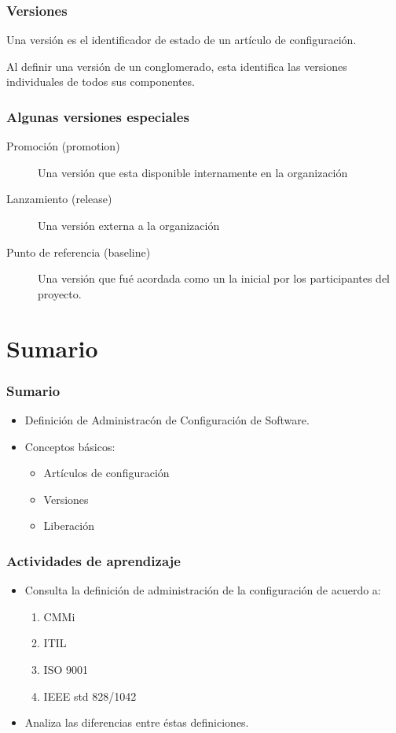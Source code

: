 \begin{frame}
\frametitle{Versiones}

\begin{definicion}
Una \alert{versi\'on} es el identificador de estado de un art\'iculo de
configuraci\'on. 
\end{definicion}
Al definir una versi\'on de un conglomerado, esta identifica las versiones
individuales de todos sus componentes. 
\end{frame}

\begin{frame}
\frametitle{Algunas versiones especiales}
\begin{description}
\item[Promoci\'on (promotion)] Una versi\'on que esta disponible internamente en
la organizaci\'on
\item[Lanzamiento (release)] Una versi\'on externa a la organizaci\'on
\item[Punto de referencia (baseline)] Una versi\'on que fu\'e acordada como un
la inicial por los participantes del proyecto.  
\end{description}
\end{frame}
\section*{Sumario}

\begin{frame}
\frametitle<presentation>{Sumario}

\begin{itemize}
  \item Definici\'on de Administrac\'on de Configuraci\'on de Software.
  \item Conceptos b\'asicos: 
  \begin{itemize}
    \item Art\'iculos de configuraci\'on
    \item Versiones
    \item Liberaci\'on
  \end{itemize}
\end{itemize}
\end{frame}
\begin{frame}
	\frametitle{Actividades de aprendizaje}
	\begin{itemize}
		\item Consulta la definici\'on de administraci\'on de la configuraci\'on de acuerdo a:
			\begin{enumerate}
				\item CMMi
				\item ITIL
				\item ISO 9001
				\item IEEE std 828/1042
			\end{enumerate}
		\item Analiza las diferencias entre \'estas definiciones.
	\end{itemize}
\end{frame}
